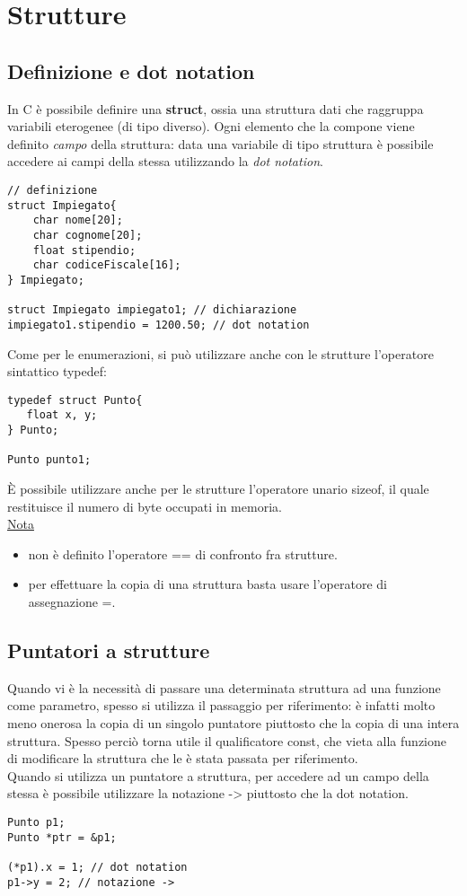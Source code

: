 \section{Strutture}
\subsection{Definizione e dot notation}
In C è possibile definire una \textbf{struct}, ossia una struttura dati che raggruppa variabili eterogenee (di tipo diverso). Ogni elemento che la compone viene definito \textit{campo} della struttura: data una variabile di tipo struttura è possibile accedere ai campi della stessa utilizzando la \textit{dot notation}.
\begin{lstlisting}[title={Esempio di definizione di struttura}]
// definizione
struct Impiegato{
    char nome[20];
    char cognome[20];
    float stipendio;
    char codiceFiscale[16];
} Impiegato;

struct Impiegato impiegato1; // dichiarazione
impiegato1.stipendio = 1200.50; // dot notation
\end{lstlisting}
Come per le enumerazioni, si può utilizzare anche con le strutture l'operatore sintattico \colorbox{light-gray}{typedef}:
\begin{lstlisting}[title={Esempio di definizione di struttura con typedef}]
typedef struct Punto{
   float x, y;
} Punto;

Punto punto1;
\end{lstlisting}
\`{E} possibile utilizzare anche per le strutture l’operatore unario \colorbox{light-gray}{sizeof}, il quale restituisce il numero di byte occupati in memoria.\\
\underline{Nota}
\begin{itemize}[noitemsep]
	\item non è definito l'operatore \colorbox{light-gray}{==} di confronto fra strutture.
	\item per effettuare la copia di una struttura basta usare l'operatore di assegnazione \colorbox{light-gray}{=}.
\end{itemize}

\subsection{Puntatori a strutture}
Quando vi è la necessità di passare una determinata struttura ad una funzione come parametro, spesso si utilizza il passaggio per riferimento: è infatti molto meno onerosa la copia di un singolo puntatore piuttosto che la copia di una intera struttura. Spesso perciò torna utile il qualificatore \colorbox{light-gray}{const}, che vieta alla funzione di modificare la struttura che le è stata passata per riferimento.\\

Quando si utilizza un puntatore a struttura, per accedere ad un campo della stessa è possibile utilizzare la notazione \colorbox{light-gray}{->} piuttosto che la dot notation.
\begin{lstlisting}[title={Accesso ai campi di un puntatore a struttura}]
Punto p1;
Punto *ptr = &p1;

(*p1).x = 1; // dot notation
p1->y = 2; // notazione ->
\end{lstlisting}
